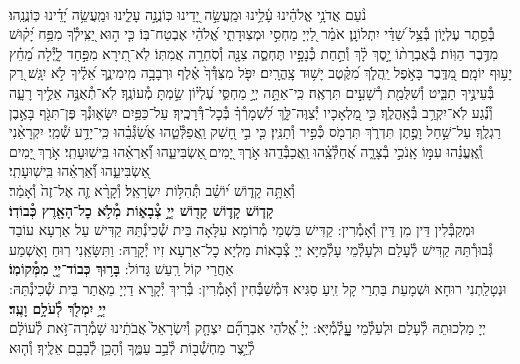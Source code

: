 \documentclass[twoside, openany, parskip=half, 11pt]{book}
\begin{document}
\label{vihi noam}
 \\
נֹ֨עַם אֲדֹנָ֥י אֱלֹהֵ֗ינוּ עָ֫לֵ֥ינוּ וּמַֽעֲשֵׂ֣ה יָ֭דֵינוּ כּֽוֹנֲנָ֣ה עָלֵ֑ינוּ וּמַֽעֲשֵׂ֥ה יָ֝דֵ֗ינוּ כּֽוֹנֲנֵֽהוּ׃\\
בְּ֯סֵ֣תֶר עֶלְי֑וֹן בְּ֯צֵ֥ל שַׁ֝דַּ֗י יִתְלוֹנָֽן׃
אֹמַ֗ר לַ֭יְיָ מַחְסִ֣י וּמְצֽוּדָתִ֑י אֱ֝לֹהַ֗י אֶבְטַח־בּֽוֹ׃
כִּ֤י ה֣וּא יַ֭צִּֽילְ֯ךָ מִפַּ֥ח יָ֝ק֗וּשׁ מִדֶּ֥בֶר הַוּֽוֹת׃
בְּ֯אֶבְרָת֨וֹ יָ֣סֶךְ לָ֗ךְ וְ֯תַ֣חַת כְּ֯נָפָ֣יו תֶּחְסֶ֑ה צִנָּ֖ה וְ֯סֹֽחֵרָ֣ה אֲמִתּֽוֹ׃
לֹֽא־תִ֭ירָא מִפַּ֣חַד לָ֑יְ֯לָה מֵ֝חֵ֗ץ יָע֥וּף יוֹמָֽם׃
מִ֭דֶּֽבֶר בָּאֹ֣פֶל יַֽהֲלֹ֑ךְ מִ֝קֶּ֗טֶב יָשׁ֥וּד צָֽהֳרָֽיִם׃
יִפֹּ֤ל מִצִּדְּ֯ךָ֙ אֶ֗לֶף וּרְבָבָ֥ה מִֽימִינֶ֑ךָ אֵ֝לֶ֗יךָ לֹ֣א יִגָּֽשׁ׃
רַ֭ק בְּ֯עֵינֶ֣יךָ תַבִּ֑יט וְ֯שִׁלֻּמַ֖ת רְ֯שָׁעִ֣ים תִּרְאֶֽה׃
כִּֽי־אַתָּ֣ה יְיָ֣ מַחְסִּ֑י עֶ֝לְי֗וֹן שַׂ֣מְתָּ מְ֯עוֹנֶֽךָ׃
לֹֽא־תְ֯אֻנֶּ֣ה אֵלֶ֣יךָ רָעָ֑ה וְ֯נֶ֗֝גַע לֹֽא־יִקְרַ֥ב בְּ֯אָֽהֳלֶֽךָ׃
כִּ֣י מַ֭לְאָכָיו יְ֯צַוֶּה־לָּ֑ךְ לִ֝שְׁמָרְ֯ךָ֗ בְּ֯כׇל־דְּ֯רָכֶֽיךָ׃
עַל־כַּפַּ֥יִם יִשָּׂא֑וּנְ֯ךָ פֶּן־תִּגֹּ֖ף בָּאֶ֣בֶן רַגְלֶֽךָ׃
עַל־שַׁ֣חַל וָפֶ֣תֶן תִּדְרֹ֑ךְ תִּרְמֹ֖ס כְּ֯פִ֣יר וְ֯תַנִּֽין׃
כִּ֤י בִ֣י חָ֭שַׁק וַֽאֲפַלְּ֯טֵ֑הוּ אֲשַׂ֝גְּ֯בֵ֗הוּ כִּֽי־יָדַ֥ע שְׁ֯מִֽי׃
יִקְרָאֵ֨נִי וְֽ֯אֶֽעֱנֵ֗הוּ עִמּ֣וֹ אָֽנֹכִ֣י בְ֯צָרָ֑ה אֲ֝חַלְּ֯צֵֽ֗הוּ וַֽאֲכַבְּ֯דֵֽהוּ׃
אֹ֣רֶךְ יָ֭מִים ֖אַשְׂבִּיעֵ֑הוּ וְ֝֯אַרְאֵ֗הוּ בִּֽישֽׁוּעָתִֽי׃
אֹ֣רֶךְ יָ֭מִים ֖אַשְׂבִּיעֵ֑הוּ וְ֝֯אַרְאֵ֗הוּ בִּֽישֽׁוּעָתִֽי׃\\
\label{v ata kadosh}
וְ֯אַתָּ֥ה
%
קָד֑וֹשׁ י֝וֹשֵׁ֗ב תְּ֯הִלּ֥וֹת יִשְׂרָאֵֽל׃
%
וְ֯קָרָ֨א זֶ֤ה אֶל־זֶה֙ וְ֯אָמַ֔ר׃\\
\textbf{קָד֧וֹשׁ קָד֛וֹשׁ קָד֖וֹשׁ יְיָ֣ צְ֯בָא֑וֹת מְ֯לֹ֥א כׇל־הָאָ֖רֶץ כְּ֯בוֹדֽוֹ׃}\\
וּמְקַבְּ֯לִין דֵּין מִן דֵּין וְ֯אָמְ֯רִין: קַדִּישׁ בִּשְׁמֵי מְ֯רוֹמָא עִלָּאָה בֵּית שְׁ֯כִינְ֯תֵּהּ קַדִּישׁ עַל אַרְעָא עוֹבַד גְּ֯בוּרְ֯תֵּהּ קַדִּישׁ לְ֯עָלַם וּלְעָלְ֯מֵי עָלְ֯מַיָּא יְיָ צְ֯בָאוֹת מַלְיָא כׇל־אַרְעָא זִיו יְ֯קָרֵהּ:  וַתִּשָּׂאֵֽנִי רֽוּחַ וָאֶשְׁמַע אַחֲרַי קוֹל רַֽעַשׁ גָּדוֹל:
\textbf{בָּר֥וּךְ כְּבוֹד־יְיָ֖ מִמְּ֯קוֹמֽוֹ׃} \\
וּנְטָלַֽתְנִי רוּחָא וּשְׁמָעֵת בַּתְרַי קָל זִֽיעַ סַגִּיא דִּמְ֯שַׁבְּ֯חִין וְ֯אָמְ֯רִין: בְּ֯רִיךְ יְ֯קָרָא דַיְיָ מֵאֲתַר בֵּית שְׁ֯כִינְ֯תֵּהּ:
\textbf{יְיָ֥ יִמְלֹ֖ךְ לְ֯עֹלָ֥ם וָעֶֽד׃} \\
יְיָ מַלְכוּתֵהּ לְ֯עָלַם וּלְעַלְ֯מֵי עׇׇׇׇׇלְ֯מְ֯יָּא: יְיָ֗
%
אֱ֠לֹהֵי אַבְרָהָ֞ם יִצְחָ֤ק וְ֯יִשְׂרָאֵל֙ אֲבֹתֵ֔ינוּ שָׁמְ֯רָה־זֹּ֣את לְ֯עוֹלָ֔ם לְ֯יֵ֥צֶר מַחְשְׁ֯ב֖וֹת לְ֯בַ֣ב עַמֶּ֑ךָ וְ֯הָכֵ֥ן לְ֯בָבָ֖ם אֵלֶֽיךָ׃ וְ֯ה֤וּא
\end{document}
